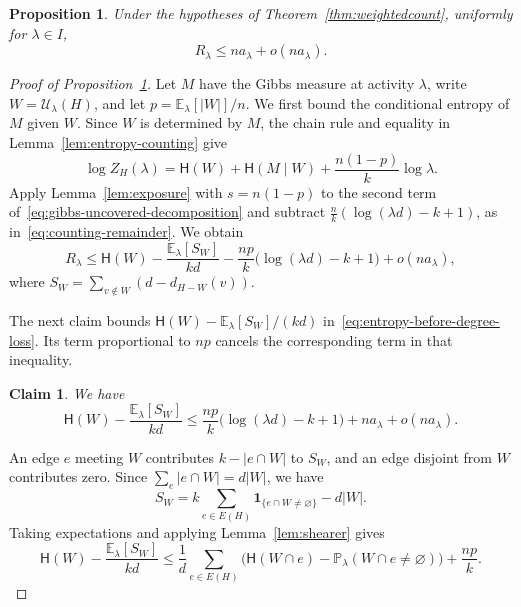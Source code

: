 \documentclass[11pt,reqno]{amsart}
\makeatletter
\numberwithin{equation}{section}
\theoremstyle{plain}
\newtheorem{proposition}[theorem]{Proposition}
\newtheorem{claim}{Claim}[section]
\newenvironment{claimproof}[1][Proof]{\par
    \pushQED{\qed}%
    \renewcommand{\qedsymbol}{$\blacksquare$}
    \normalfont \topsep6\p@\@plus6\p@\relax
    \trivlist
    \item[\hskip\labelsep
    \textit{#1}\@addpunct{.}~]\ignorespaces
}{%
    \popQED\endtrivlist\@endpefalse
}
\theoremstyle{definition}
\newcommand{\E}{\mathbb E}
\newcommand{\Prob}{\mathbb P}
\newcommand{\HH}{\mathsf H}
\newcommand{\calU}{\mathcal U}
\makeatother
\begin{document}
\begin{proposition}\label{prop:deficit}
    Under the hypotheses of Theorem~\ref{thm:weightedcount}, uniformly for $\lambda\in I$,
    \[
        R_\lambda\le na_\lambda+o(na_\lambda).
    \]
\end{proposition}
\begin{proof}[Proof of Proposition~\ref{prop:deficit}]
    Let $M$ have the Gibbs measure at activity $\lambda$, write $W=\calU_\lambda(H)$, and let $p=\E_\lambda[|W|]/n$.
    We first bound the conditional entropy of $M$ given $W$.
    Since $W$ is determined by $M$, the chain rule and equality in Lemma~\ref{lem:entropy-counting} give
    \begin{equation}\label{eq:gibbs-uncovered-decomposition}
        \log Z_H(\lambda)=\HH(W)+\HH(M\mid W)+\frac{n(1-p)}k\log\lambda.
    \end{equation}
    Apply Lemma~\ref{lem:exposure} with $s=n(1-p)$ to the second term of~\eqref{eq:gibbs-uncovered-decomposition} and subtract $\frac nk(\log(\lambda d)-k+1)$, as in~\eqref{eq:counting-remainder}.
    We obtain
    \begin{equation}\label{eq:entropy-before-degree-loss}
        R_\lambda\le\HH(W)-\frac{\E_\lambda[S_W]}{kd}
        -\frac{np}{k}\bigl(\log(\lambda d)-k+1\bigr)+o(na_\lambda),
    \end{equation}
    where $S_W=\sum_{v\notin W}(d-d_{H-W}(v))$.

    The next claim bounds $\HH(W)-\E_\lambda[S_W]/(kd)$ in~\eqref{eq:entropy-before-degree-loss}.
    Its term proportional to $np$ cancels the corresponding term in that inequality.

    \begin{claim}\label{clm:vacancy-degree-loss}
        We have
        \[
            \HH(W)-\frac{\E_\lambda[S_W]}{kd}
            \le\frac{np}{k}\bigl(\log(\lambda d)-k+1\bigr)+na_\lambda+o(na_\lambda).
        \]
    \end{claim}
    \begin{claimproof}[Proof of Claim~\ref{clm:vacancy-degree-loss}]
        An edge $e$ meeting $W$ contributes $k-|e\cap W|$ to $S_W$, and an edge disjoint from $W$ contributes zero.
        Since $\sum_e|e\cap W|=d|W|$, we have
        \begin{equation}\label{eq:degree-loss-edges}
            S_W=k\sum_{e\in E(H)}\mathbf1_{\{e\cap W\ne\varnothing\}}-d|W|.
        \end{equation}
        Taking expectations and applying Lemma~\ref{lem:shearer} gives
        \begin{equation}\label{eq:vacancy-shearer-bound}
            \HH(W)-\frac{\E_\lambda[S_W]}{kd}
            \le\frac1d\sum_{e\in E(H)}
            \bigl(\HH(W\cap e)-\Prob_\lambda(W\cap e\ne\varnothing)\bigr)
            +\frac{np}{k}.
        \end{equation}


\end{claimproof}
\end{proof}
\end{document}
